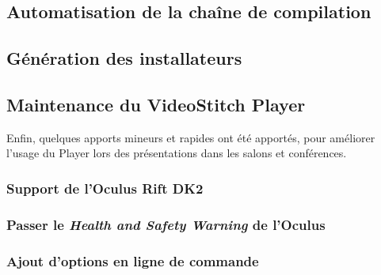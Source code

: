 \subsection{Automatisation de la chaîne de compilation}

\subsection{Génération des installateurs}

\subsection{Maintenance du VideoStitch Player}
Enfin, quelques apports mineurs et rapides ont été apportés, pour améliorer l'usage
du Player lors des présentations dans les salons et conférences.
\subsubsection{Support de l'Oculus Rift DK2}

\subsubsection{Passer le \textit{Health and Safety Warning} de l'Oculus}

\subsubsection{Ajout d'options en ligne de commande}
